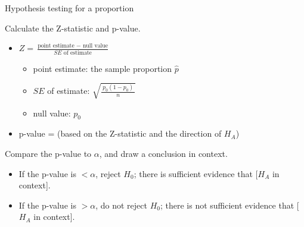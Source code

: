 \begin{onebox}{Hypothesis testing for a proportion}
\begin{itemize}
\end{itemize}
  Calculate the Z-statistic and p-value.
\begin{itemize}
\item[] $Z = \frac{\text{point estimate } - \text{ null value}}{SE \text{ of estimate}}$
\begin{itemize}
\item[] point estimate: the sample proportion $\hat{p}$
\item[] $SE$ of estimate:  $\sqrt{\frac{\ p_0(1-p_0)\ }{n}}$
\item[] null value: $p_0$
\end{itemize}
\item[] p-value = (based on the Z-statistic and the direction of $H_A$)
\end{itemize}
  Compare the p-value to $\alpha$, and draw a conclusion in context.  \vspace{-1mm}
\begin{itemize}
\item[] If the p-value is $< \alpha$, reject $H_0$; there is sufficient evidence that [$H_A$ in context]. 
\item[] If the p-value is $> \alpha$, do not reject $H_0$; there is not sufficient evidence that [$H_A$ in context].
\end{itemize}\end{onebox}


